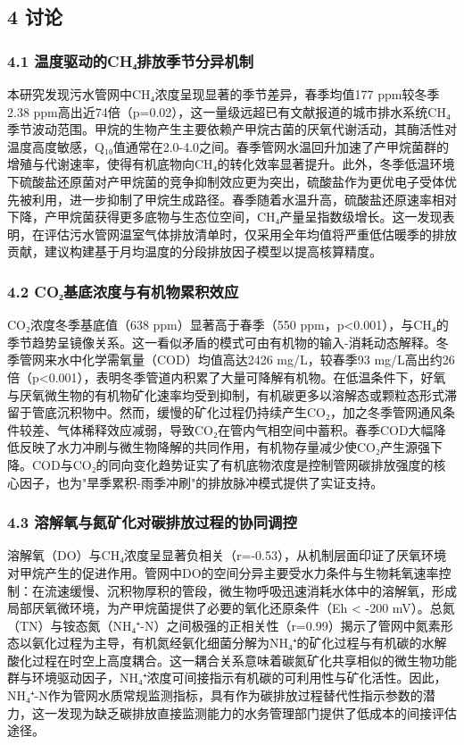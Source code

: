 \subsection{4 讨论}

\subsubsection{4.1 温度驱动的CH₄排放季节分异机制}

本研究发现污水管网中CH₄浓度呈现显著的季节差异，春季均值177 ppm较冬季2.38 ppm高出近74倍（p=0.02），这一量级远超已有文献报道的城市排水系统CH₄季节波动范围。甲烷的生物产生主要依赖产甲烷古菌的厌氧代谢活动，其酶活性对温度高度敏感，Q₁₀值通常在2.0-4.0之间。春季管网水温回升加速了产甲烷菌群的增殖与代谢速率，使得有机底物向CH₄的转化效率显著提升。此外，冬季低温环境下硫酸盐还原菌对产甲烷菌的竞争抑制效应更为突出，硫酸盐作为更优电子受体优先被利用，进一步抑制了甲烷生成路径。春季随着水温升高，硫酸盐还原速率相对下降，产甲烷菌获得更多底物与生态位空间，CH₄产量呈指数级增长。这一发现表明，在评估污水管网温室气体排放清单时，仅采用全年均值将严重低估暖季的排放贡献，建议构建基于月均温度的分段排放因子模型以提高核算精度。

\subsubsection{4.2 CO₂基底浓度与有机物累积效应}

CO₂浓度冬季基底值（638 ppm）显著高于春季（550 ppm，p<0.001），与CH₄的季节趋势呈镜像关系。这一看似矛盾的模式可由有机物的输入-消耗动态解释。冬季管网来水中化学需氧量（COD）均值高达2426 mg/L，较春季93 mg/L高出约26倍（p<0.001），表明冬季管道内积累了大量可降解有机物。在低温条件下，好氧与厌氧微生物的有机物矿化速率均受到抑制，有机碳更多以溶解态或颗粒态形式滞留于管底沉积物中。然而，缓慢的矿化过程仍持续产生CO₂，加之冬季管网通风条件较差、气体稀释效应减弱，导致CO₂在管内气相空间中蓄积。春季COD大幅降低反映了水力冲刷与微生物降解的共同作用，有机物存量减少使CO₂产生源强下降。COD与CO₂的同向变化趋势证实了有机底物浓度是控制管网碳排放强度的核心因子，也为"旱季累积-雨季冲刷"的排放脉冲模式提供了实证支持。

\subsubsection{4.3 溶解氧与氮矿化对碳排放过程的协同调控}

溶解氧（DO）与CH₄浓度呈显著负相关（r=-0.53），从机制层面印证了厌氧环境对甲烷产生的促进作用。管网中DO的空间分异主要受水力条件与生物耗氧速率控制：在流速缓慢、沉积物厚积的管段，微生物呼吸迅速消耗水体中的溶解氧，形成局部厌氧微环境，为产甲烷菌提供了必要的氧化还原条件（Eh < -200 mV）。总氮（TN）与铵态氮（NH₄⁺-N）之间极强的正相关性（r=0.99）揭示了管网中氮素形态以氨化过程为主导，有机氮经氨化细菌分解为NH₄⁺的矿化过程与有机碳的水解酸化过程在时空上高度耦合。这一耦合关系意味着碳氮矿化共享相似的微生物功能群与环境驱动因子，NH₄⁺浓度可间接指示有机碳的可利用性与矿化活性。因此，NH₄⁺-N作为管网水质常规监测指标，具有作为碳排放过程替代性指示参数的潜力，这一发现为缺乏碳排放直接监测能力的水务管理部门提供了低成本的间接评估途径。

